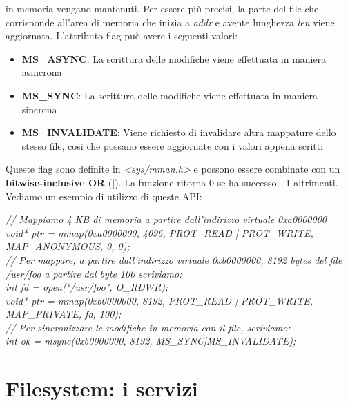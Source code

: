 \documentclass[12pt]{article}
\begin{document}
in memoria vengano mantenuti. Per essere più precisi, la parte del file che corrisponde all'area di memoria che
inizia a \textit{addr} e avente lunghezza \textit{len} viene aggiornata. L'attributo flag può avere i seguenti valori:
\begin{itemize}
    \item \textbf{MS\_ASYNC}: La scrittura delle modifiche viene effettuata in maniera asincrona
    \item \textbf{MS\_SYNC}: La scrittura delle modifiche viene effettuata in maniera sincrona
    \item \textbf{MS\_INVALIDATE}: Viene richiesto di invalidare altra mappature dello stesso file, così che possano essere aggiornate con i valori appena scritti
\end{itemize}
Queste flag sono definite in \textit{<sys/mman.h>} e possono essere combinate con un \textbf{bitwise-inclusive OR} (|).
La funzione ritorna 0 se ha successo, -1 altrimenti.
Vediamo un esempio di utilizzo di queste API:
\begin{center}
    \textit{// Mappiamo 4 KB di memoria a partire dall'indirizzo virtuale 0xa0000000} \\
    \textit{void* ptr = mmap(0xa0000000, 4096, PROT\_READ | PROT\_WRITE, MAP\_ANONYMOUS, 0, 0);} \\
    \textit{// Per mappare, a partire dall'indirizzo virtuale 0xb0000000, 8192 bytes del file /usr/foo a partire dal byte 100 scriviamo:} \\
    \textit{int fd = open("/usr/foo", O\_RDWR);} \\
    \textit{void* ptr = mmap(0xb0000000, 8192, PROT\_READ | PROT\_WRITE, MAP\_PRIVATE, fd, 100);} \\
    \textit{// Per sincronizzare le modifiche in memoria con il file, scriviamo:} \\
    \textit{int ok = msync(0xb0000000, 8192, MS\_SYNC|MS\_INVALIDATE);}
\end{center}
\section{Filesystem: i servizi}
\end{document}
